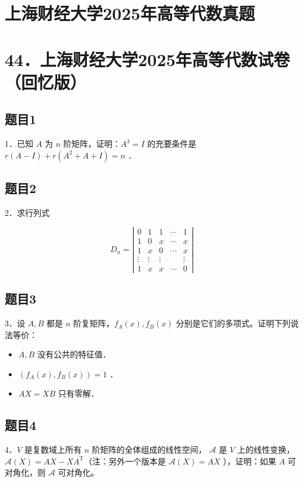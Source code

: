 \documentclass{article}
\begin{document}
\section*{上海财经大学2025年高等代数真题}
\section*{44．上海财经大学2025年高等代数试卷（回忆版）}

\subsection{题目1}
1．已知 \(A\) 为 \(n\) 阶矩阵，证明：\(A^{3}=I\) 的充要条件是 \(r(A-I)+r\left(A^{2}+A+I\right)=n\) ．

\subsection{题目2}
2．求行列式

\[
D_{n}=\left|\begin{array}{ccccc}
0 & 1 & 1 & \cdots & 1 \\
1 & 0 & x & \cdots & x \\
1 & x & 0 & \cdots & x \\
\vdots & \vdots & \vdots & & \vdots \\
1 & x & x & \cdots & 0
\end{array}\right|
\]

\subsection{题目3}
3．设 \(A, B\) 都是 \(n\) 阶复矩阵，\(f_{A}(x), f_{B}(x)\) 分别是它们的多项式。证明下列说法等价：

\begin{itemize}
  \item[（1）] \(A, B\) 没有公共的特征值．
  \item[（2）] \(\left(f_{A}(x), f_{B}(x)\right)=1\) ．
  \item[（3）] \(A X=X B\) 只有零解．
\end{itemize}

\subsection{题目4}
4．\(V\) 是复数域上所有 \(n\) 阶矩阵的全体组成的线性空间， \(\mathcal{A}\) 是 \(V\) 上的线性变换， \(\mathcal{A}(X)=A X-X A^{\mathrm{T}}\)（注：另外一个版本是 \(\mathcal{A}(X)=A X\) ），证明：如果 \(A\) 可对角化，则 \(\mathcal{A}\) 可对角化。
\end{document}
